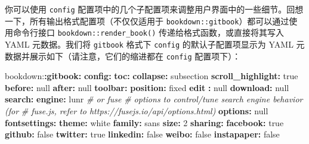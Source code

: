 \documentclass[
  12pt,
]{krantz}
\newenvironment{Shaded}{\begin{snugshade}}{\end{snugshade}}
\newcommand{\AttributeTok}[1]{\textcolor[rgb]{0.13,0.29,0.53}{#1}}
\newcommand{\CharTok}[1]{\textcolor[rgb]{0.31,0.60,0.02}{#1}}
\newcommand{\CommentTok}[1]{\textcolor[rgb]{0.56,0.35,0.01}{\textit{#1}}}
\newcommand{\DecValTok}[1]{\textcolor[rgb]{0.00,0.00,0.81}{#1}}
\newcommand{\FunctionTok}[1]{\textcolor[rgb]{0.13,0.29,0.53}{\textbf{#1}}}
\newcommand{\KeywordTok}[1]{\textcolor[rgb]{0.13,0.29,0.53}{\textbf{#1}}}
\theoremstyle{definition}
\theoremstyle{definition}
\theoremstyle{definition}
\theoremstyle{definition}
\theoremstyle{remark}
\begin{document}
你可以使用 \texttt{config} 配置项中的几个子配置项来调整用户界面中的一些细节。回想一下，所有输出格式配置项（不仅仅适用于 \texttt{bookdown::gitbook}）都可以通过使用命令行接口 \texttt{bookdown::render\_book()} 传递给格式函数，或直接将其写入 YAML 元数据。我们将 \texttt{gitbook} 格式下 \texttt{config} 的默认子配置项显示为 YAML 元数据并展示如下（请注意，它们的缩进都在 \texttt{config} 配置项下）：

\begin{Shaded}
\begin{Highlighting}[]
\AttributeTok{bookdown:}\FunctionTok{:gitbook}\KeywordTok{:}
\AttributeTok{  }\FunctionTok{config}\KeywordTok{:}
\AttributeTok{    }\FunctionTok{toc}\KeywordTok{:}
\AttributeTok{      }\FunctionTok{collapse}\KeywordTok{:}\AttributeTok{ subsection}
\AttributeTok{      }\FunctionTok{scroll\_highlight}\KeywordTok{:}\AttributeTok{ }\CharTok{true}
\AttributeTok{      }\FunctionTok{before}\KeywordTok{:}\AttributeTok{ }\CharTok{null}
\AttributeTok{      }\FunctionTok{after}\KeywordTok{:}\AttributeTok{ }\CharTok{null}
\AttributeTok{    }\FunctionTok{toolbar}\KeywordTok{:}
\AttributeTok{      }\FunctionTok{position}\KeywordTok{:}\AttributeTok{ fixed}
\AttributeTok{    }\FunctionTok{edit }\KeywordTok{:}\AttributeTok{ }\CharTok{null}
\AttributeTok{    }\FunctionTok{download}\KeywordTok{:}\AttributeTok{ }\CharTok{null}
\AttributeTok{    }\FunctionTok{search}\KeywordTok{:}
\AttributeTok{      }\FunctionTok{engine}\KeywordTok{:}\AttributeTok{ lunr}\CommentTok{ \# or fuse}
\CommentTok{      \# options to control/tune search engine behavior (for}
\CommentTok{      \# fuse.js, refer to https://fusejs.io/api/options.html)}
\AttributeTok{      }\FunctionTok{options}\KeywordTok{:}\AttributeTok{ }\CharTok{null}
\AttributeTok{    }\FunctionTok{fontsettings}\KeywordTok{:}
\AttributeTok{      }\FunctionTok{theme}\KeywordTok{:}\AttributeTok{ white}
\AttributeTok{      }\FunctionTok{family}\KeywordTok{:}\AttributeTok{ sans}
\AttributeTok{      }\FunctionTok{size}\KeywordTok{:}\AttributeTok{ }\DecValTok{2}
\AttributeTok{    }\FunctionTok{sharing}\KeywordTok{:}
\AttributeTok{      }\FunctionTok{facebook}\KeywordTok{:}\AttributeTok{ }\CharTok{true}
\AttributeTok{      }\FunctionTok{github}\KeywordTok{:}\AttributeTok{ }\CharTok{false}
\AttributeTok{      }\FunctionTok{twitter}\KeywordTok{:}\AttributeTok{ }\CharTok{true}
\AttributeTok{      }\FunctionTok{linkedin}\KeywordTok{:}\AttributeTok{ }\CharTok{false}
\AttributeTok{      }\FunctionTok{weibo}\KeywordTok{:}\AttributeTok{ }\CharTok{false}
\AttributeTok{      }\FunctionTok{instapaper}\KeywordTok{:}\AttributeTok{ }\CharTok{false}

\end{Highlighting}
\end{Shaded}
\end{document}
